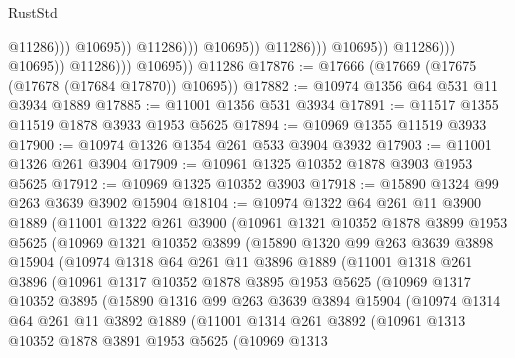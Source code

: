\begin{lexlean}{RustStd}
\begin{coremodule}
                                                      @11286)))
                                                @10695))
                                            @11286)))
                                      @10695))
                                  @11286)))
                            @10695))
                        @11286)))
                  @10695))
              @11286)))
        @10695))
    @11286
@17876 := @17666 (@17669 (@17675 (@17678 (@17684 @17870)) @10695))
@17882 := @10974 @1356 @64 @531 @11 @3934 @1889
@17885 := @11001 @1356 @531 @3934
@17891 := @11517 @1355 @11519 @1878 @3933 @1953 @5625
@17894 := @10969 @1355 @11519 @3933
@17900 := @10974 @1326 @1354 @261 @533 @3904 @3932
@17903 := @11001 @1326 @261 @3904
@17909 := @10961 @1325 @10352 @1878 @3903 @1953 @5625
@17912 := @10969 @1325 @10352 @3903
@17918 := @15890 @1324 @99 @263 @3639 @3902 @15904
@18104 := @10974
    @1322
    @64
    @261
    @11
    @3900
    @1889
    (@11001
      @1322
      @261
      @3900
      (@10961
        @1321
        @10352
        @1878
        @3899
        @1953
        @5625
        (@10969
          @1321
          @10352
          @3899
          (@15890
            @1320
            @99
            @263
            @3639
            @3898
            @15904
            (@10974
              @1318
              @64
              @261
              @11
              @3896
              @1889
              (@11001
                @1318
                @261
                @3896
                (@10961
                  @1317
                  @10352
                  @1878
                  @3895
                  @1953
                  @5625
                  (@10969
                    @1317
                    @10352
                    @3895
                    (@15890
                      @1316
                      @99
                      @263
                      @3639
                      @3894
                      @15904
                      (@10974
                        @1314
                        @64
                        @261
                        @11
                        @3892
                        @1889
                        (@11001
                          @1314
                          @261
                          @3892
                          (@10961
                            @1313
                            @10352
                            @1878
                            @3891
                            @1953
                            @5625
                            (@10969
                              @1313

\end{coremodule}
\end{lexlean}

